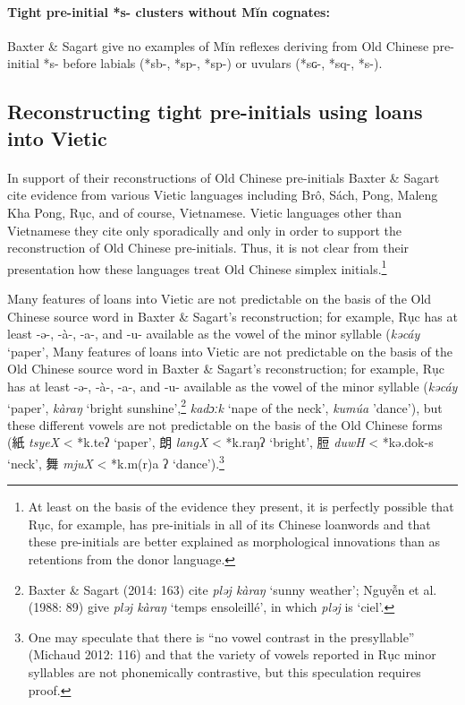 \paragraph{Tight pre-initial *s- clusters
without Mĭn cognates:} Baxter \& Sagart give no
examples of Mĭn reflexes deriving from Old Chinese pre-initial *s-
before labials (*sb-, *sp-, *sp{}-) or uvulars (*sɢ-, *sq-, *s{}-).

\subsection{Reconstructing tight pre-initials using loans into
Vietic}\label{reconstructing-tight-pre-initials-using-loans-into-vietic}

\paragraph{}In support of their
reconstructions of Old Chinese pre-initials Baxter \& Sagart cite
evidence from various Vietic languages including Brô, Sách, Pong, Maleng
Kha Pong, Rục, and of course, Vietnamese. Vietic languages other than
Vietnamese they cite only sporadically and only in order to support the
reconstruction of Old Chinese pre-initials. Thus, it is not clear from
their presentation how these languages treat Old Chinese simplex
initials.\footnote{At least on the basis of the evidence they present,
  it is perfectly possible that Rục, for example, has pre-initials in
  all of its Chinese loanwords and that these pre-initials are better
  explained as morphological innovations than as retentions from the
  donor language. }

Many features of loans into Vietic are not predictable on the basis of
the Old Chinese source word in Baxter \& Sagart's reconstruction; for
example, Rục has at least -ə-, -à-, -a-, and -u- available as the vowel
of the minor syllable (\emph{kəcáy} `paper',
\protect\hypertarget{anchor-47}{}{}Many features of loans into Vietic
are not predictable on the basis of the Old Chinese source word in
Baxter \& Sagart's reconstruction; for example, Rục has at least -ə-,
-à-, -a-, and -u- available as the vowel of the minor syllable
(\emph{kəcáy} `paper',  \emph{kàraŋ} `bright sunshine',\footnote{Baxter
  \& Sagart (2014: 163) cite  \emph{pləj kàraŋ} `sunny weather'; Nguyễn
  et al. (1988: 89) give \emph{pləj kàraŋ} `temps ensoleillé', in which
   \emph{pləj} is `ciel'.} \emph{kadɔːk} `nape of the neck',  \emph{kumúa}
'dance'), but these different vowels are not predictable on the basis of
the Old Chinese forms (紙 \emph{tsyeX} \textless{} *k.teʔ `paper', 朗
 \emph{langX} \textless{} *k.r{}aŋʔ `bright', 脰  \emph{duwH} \textless{}
*kə.d{}ok-s `neck', 舞 \emph{mjuX} \textless{} *k.m(r)a ʔ
`dance').\footnote{One may speculate that there is ``no vowel contrast
  in the presyllable'' (Michaud 2012: 116) and that the variety of
  vowels reported in Rục minor syllables are not phonemically
  contrastive, but this speculation requires proof.}


